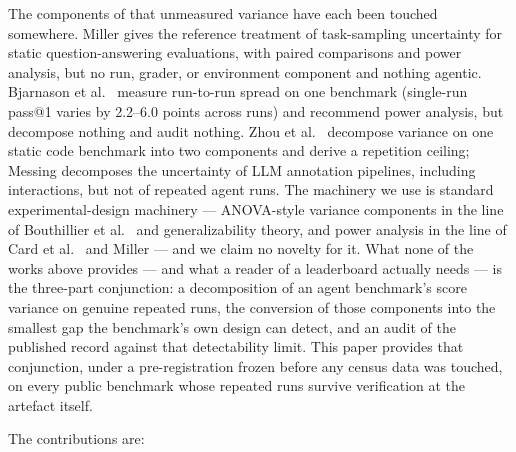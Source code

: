 \documentclass[11pt]{article}
\begin{document}
The components of that unmeasured variance have each been touched
somewhere. Miller \cite{miller2024} gives the reference treatment of
task-sampling uncertainty for static question-answering evaluations,
with paired comparisons and power analysis, but no run, grader, or
environment component and nothing agentic. Bjarnason et al.\
\cite{bjarnason2026} measure run-to-run spread on one benchmark
(single-run pass@1 varies by 2.2--6.0 points across runs) and recommend
power analysis, but decompose nothing and audit nothing. Zhou et al.\
\cite{zhou2026} decompose variance on one static code benchmark into
two components and derive a repetition ceiling; Messing
\cite{messing2026} decomposes the uncertainty of LLM annotation
pipelines, including interactions, but not of repeated agent runs.
The machinery we use is standard experimental-design machinery ---
ANOVA-style variance components in the line of Bouthillier et al.\
\cite{bouthillier2021} and generalizability theory, and power analysis
in the line of Card et al.\ \cite{card2020} and Miller
\cite{miller2024} --- and we claim no novelty for it. What none of the
works above provides --- and what a reader of a leaderboard actually
needs --- is the three-part conjunction: a decomposition of an agent
benchmark's score variance on genuine repeated runs, the conversion of
those components into the smallest gap the benchmark's own design can
detect, and an audit of the published record against that detectability
limit. This paper provides that conjunction, under a pre-registration
frozen before any census data was touched, on every public benchmark
whose repeated runs survive verification at the artefact itself.

The contributions are:
\end{document}
